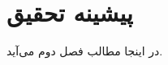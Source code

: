 \chapter{پیشینه تحقیق}\label{review}

در اینجا مطالب فصل دوم می‌آید.

























































































